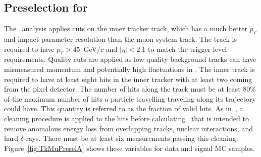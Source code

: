 \subsection{Preselection for \tktof\ \label{sec:tktofpreselection}}

The \tktof\ analysis applies cuts on the inner tracker track, which has a much better $p_T$ and impact parameter resolution than the muon system track.
The track is required to have $p_T > 45$~GeV/$c$ and  $|\eta| < 2.1$ to match the trigger level requirements. 
Quality cuts are applied as low quality background tracks can have mismeasured momentum and potentially high fluctuations in \dedx.
The inner track is required to have at least eight hits in the inner tracker with at least two coming from the pixel detector. 
The number of hits along the track must be at least 80\% of the maximum number of hits a particle travelling traveling along its trajectory could have.
This quantity is referred to as the fraction of valid hits.
As in~\cite{Chatrchyan:2012sp}, a cleaning procedure is applied to the hits before calculating \dedx\ that is 
intended to remove anomalous energy loss from overlapping tracks, nuclear interactions, and hard $\delta$-rays.
There must be at least six measurements passing this cleaning.
Figure~\ref{fig:TkMuPreselA} shows these variables for data and signal MC samples.

